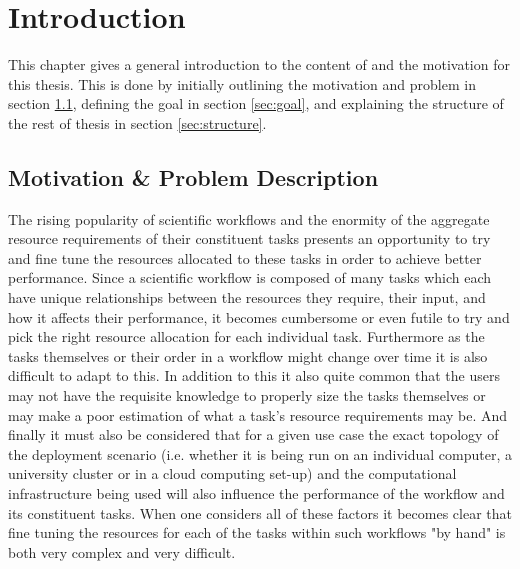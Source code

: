 
\cleardoublepage
\chapter{Introduction}
\label{cha:introduction}

This chapter gives a general introduction to the content of and the motivation for this thesis. This is done by initially outlining the motivation and problem in section \ref{sec:motivation}, defining the goal in section \ref{sec:goal}, and explaining the structure of the rest of thesis in section \ref{sec:structure}.

\section{Motivation \& Problem Description}
\label{sec:motivation}


The rising popularity of scientific workflows and the enormity of the aggregate resource requirements of their constituent tasks \cite{ResourceProvisioning} presents an opportunity to try and fine tune the resources allocated to these tasks in order to achieve better performance. Since a scientific workflow is composed of many tasks which each have unique relationships between the resources they require, their input, and how it affects their performance, it becomes cumbersome or even futile to try and pick the right resource allocation for each individual task. Furthermore as the tasks themselves or their order in a workflow might change over time it is also difficult to adapt to this. In addition to this it also quite common that the users may not have the requisite knowledge to properly size the tasks themselves or may make a poor estimation \cite{Predictability} of what a task's resource requirements may be. And finally it must also be considered that for a given use case the exact topology of the deployment scenario (i.e. whether it is being run on an individual computer, a university cluster or  in a cloud computing set-up) and the computational infrastructure being used will also influence the performance of the workflow and its constituent tasks.  When one considers all of these factors it becomes clear that fine tuning the resources for each of the tasks within such workflows "by hand" is both very complex and very difficult. 

